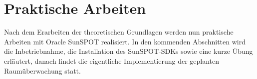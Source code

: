 \chapter{Praktische Arbeiten}\label{c:PraktischeArbeiten}

Nach dem Erarbeiten der theoretischen Grundlagen werden nun praktische Arbeiten mit Oracle SunSPOT realisiert. In den kommenden Abschnitten wird die Inbetriebnahme, die Installation des SunSPOT-SDKs sowie eine kurze Übung erläutert, danach findet die eigentliche Implementierung der geplanten Raumüber\-wachung statt.  




